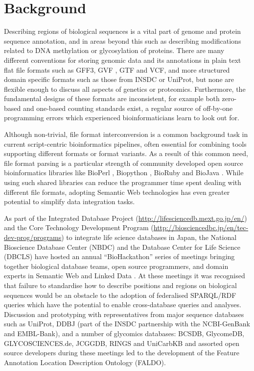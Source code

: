 \section*{Background}
Describing regions of biological sequences is a vital part of genome and protein sequence
annotation, and in areas beyond this such as describing modifications related to DNA methylation
or glycosylation of proteins.
There are many different conventions for storing genomic data and its
annotations in plain text flat file formats such as GFF3, GVF
\cite{GVF}, GTF and VCF, and more structured domain specific formats
such as those from INSDC or UniProt, but none are flexible enough to
discuss all aspects of genetics or proteomics.
Furthermore, the fundamental designs of these formats are
inconsistent, for example both zero-based and one-based counting
standards exist, a regular source of off-by-one programming errors
which experienced bioinformaticians learn to look out for.

Although non-trivial, file format interconversion is a common background task
in current script-centric bioinformatics pipelines, often essential for combining
tools supporting different formats or format variants. 
As a result of this common need, file format parsing is a particular strength of
community developed open source bioinformatics libraries like BioPerl
\cite{BioPerl2002}, Biopython \cite{Biopython2009}, BioRuby \cite{BioRuby2010}
and BioJava \cite{BioJava2012}. While using such shared libraries can reduce the
programmer time spent dealing with different file formats, adopting Semantic
Web technologies has even greater potential to simplify data integration tasks.

As part of the Integrated Database Project (\url{http://lifesciencedb.mext.go.jp/en/}) and
the Core Technology Development Program (\url{http://biosciencedbc.jp/en/tec-dev-prog/programs})
to integrate life science databases in Japan, the National Bioscience Database Center (NBDC) and the Database
Center for Life Science (DBCLS) have hosted an annual ``BioHackathon'' series
of meetings bringing together biological database teams, open source programmers,
and domain experts in Semantic Web and Linked Data \cite{BioHack2010,BioHack2011and2012}.
At these meetings it was recognised that failure to standardise how to describe positions
and regions on biological sequences would be an obstacle to the adoption of federalised
SPARQL/RDF queries which have the potential to enable cross-database queries and
analyses. Discussion and prototyping with representatives from major sequence databases
such as UniProt\cite{UniProt2013}, DDBJ\cite{DDBJ2013} (part of the INSDC partnership with the NCBI-GenBank\cite{GenBank2013} and EMBL-Bank\cite{ENA2013}),
and a number of glycomics databases: 
BCSDB\cite{doi:10.1021/ci100150d}, GlycomeDB\cite{Ranzinger01012011}, GLYCOSCIENCES.de\cite{Lutteke01052006}, JCGGDB, RINGS\cite{RINGS} and UniCarbKB\cite{UniCarbKB} and assorted open source developers during these meetings
led to the development of the Feature Annotation Location Description Ontology (FALDO).

